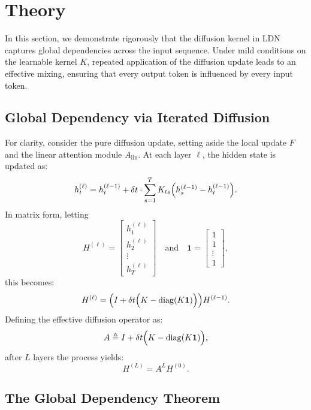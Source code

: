 
\section{Theory}

In this section, we demonstrate rigorously that the diffusion kernel in LDN captures global dependencies across the input sequence. Under mild conditions on the learnable kernel \(K\), repeated application of the diffusion update leads to an effective mixing, ensuring that every output token is influenced by every input token.

\subsection{Global Dependency via Iterated Diffusion}
For clarity, consider the pure diffusion update, setting aside the local update \(F\) and the linear attention module \(A_{\text{lin}}\). At each layer \(\ell\), the hidden state is updated as:
\[
h_t^{(\ell)} = h_t^{(\ell-1)} + \delta t \cdot \sum_{s=1}^{T} K_{ts}\Bigl( h_s^{(\ell-1)} - h_t^{(\ell-1)} \Bigr).
\]
In matrix form, letting
\[
H^{(\ell)} = \begin{bmatrix} h_1^{(\ell)} \\ h_2^{(\ell)} \\ \vdots \\ h_T^{(\ell)} \end{bmatrix} \quad \text{and} \quad \mathbf{1} = \begin{bmatrix} 1 \\ 1 \\ \vdots \\ 1 \end{bmatrix},
\]
this becomes:
\[
H^{(\ell)} = \Bigl(I + \delta t \Bigl(K - \operatorname{diag}(K \mathbf{1})\Bigr)\Bigr) H^{(\ell-1)}.
\]
Defining the effective diffusion operator as:
\[
A \triangleq I + \delta t \Bigl(K - \operatorname{diag}(K \mathbf{1})\Bigr),
\]
after \(L\) layers the process yields:
\[
H^{(L)} = A^L H^{(0)}.
\]

\subsection{The Global Dependency Theorem}


